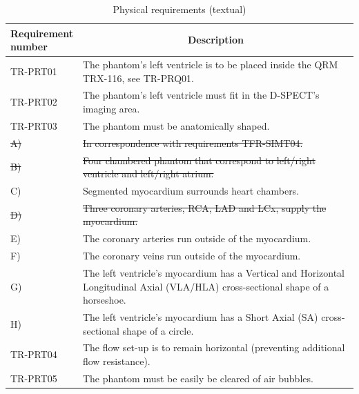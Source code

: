 \begin{table}[H]
\caption{Physical requirements (textual)}
\label{tab:physrec_text}
\begin{tabular}{l|p{115mm}|}
	\makecell[l]{\textbf{Requirement} \\  \textbf{number}} & \multicolumn{1}{c}{\textbf{Description}} \\
	\hline
	TR-PRT01 			& The phantom's left ventricle is to be placed inside the QRM TRX-116, see TR-PRQ01. \\
	TR-PRT02 			& The phantom's left ventricle must fit in the D-SPECT's imaging area. \\
	TR-PRT03 			& The phantom must be anatomically shaped. \\
	\hspace{1.5cm} \sout{A)} 	& \sout{In correspondence with requirements TFR-SIMT04.} \\
	\hspace{1.5cm} \sout{B)} 	& \sout{Four chambered phantom that correspond to left/right ventricle and left/right atrium.} \\
	\hspace{1.5cm} C) 	& Segmented myocardium surrounds heart chambers. \\
	\hspace{1.5cm}\sout{D)}	& \sout{Three coronary arteries, RCA, LAD and LCx, supply the myocardium.} \\
	\hspace{1.5cm} E) 	& The coronary arteries run outside of the myocardium. \\
	\hspace{1.5cm} F) 	& The coronary veins run outside of the myocardium. \\
	\hspace{1.5cm} G) 	& The left ventricle's myocardium has a Vertical and Horizontal Longitudinal Axial (VLA/HLA) cross-sectional shape of a horseshoe. \\
	\hspace{1.5cm} H) 	& The left ventricle's myocardium has a Short Axial (SA) cross-sectional shape of a circle. \\
	TR-PRT04 			& The flow set-up is to remain horizontal (preventing additional flow resistance). \\
	TR-PRT05 			& The phantom must be easily be cleared of air bubbles. \\
	\cline{2-2}
\end{tabular}
\end{table}


